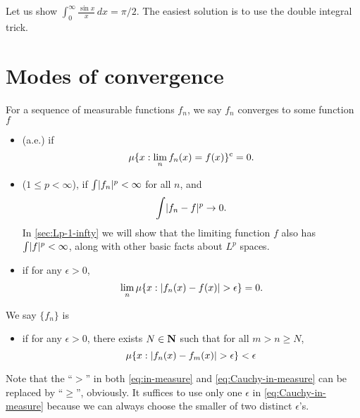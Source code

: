 \begin{namedthm}
    Let us show $\int_{0}^\infty \frac{\sin x}{x}\,dx = \pi/2$. The easiest solution is to use the double integral trick.
\end{namedthm}

\section{Modes of convergence} \label{sec:modes-conv}
\begin{defn}
    For a sequence of measurable functions ${f_n}$, we say $f_n$ converges to some function $f$ 
    \begin{itemize}
        \item {} (a.e.) if \[
            \mu\{x: \lim_n f_n(x) = f(x)\}^{\mathrm{c}} = 0.
        \]
        \item {} ($1 \leq p <\infty$), if $\int \lvert f_n \rvert^p <\infty$ for all $n$, and \[
            \int \lvert f_n - f \rvert^p \to 0.
        \]
        In \cref{sec:Lp-1-infty} we will show that the limiting function $f$ also has $\int \lvert f \rvert^p < \infty$, along with other basic facts about $L^p$ spaces.
        \item {} if for any $\epsilon > 0$, \begin{equation} \label{eq:in-measure}
            \lim_n \mu\{x : \abs{f_n(x) - f(x)} > \epsilon\} = 0.
        \end{equation}
    \end{itemize}
    We say $\{f_n\}$ is 
    \begin{itemize}
        \item {} if for any $\epsilon > 0$, there exists $N \in \mathbf{N}$ such that for all $m > n \geq N$, \begin{equation} \label{eq:Cauchy-in-measure}
            \mu\{x:\abs{f_n(x) - f_m(x)} > \epsilon \} < \epsilon
        \end{equation}
    \end{itemize}
    Note that the ``$>$'' in both \eqref{eq:in-measure} and \eqref{eq:Cauchy-in-measure} can be replaced by ``$\geq$'', obviously. It suffices to use only one $\epsilon$ in \eqref{eq:Cauchy-in-measure} because we can always choose the smaller of two distinct $\epsilon$'s.
\end{defn}


